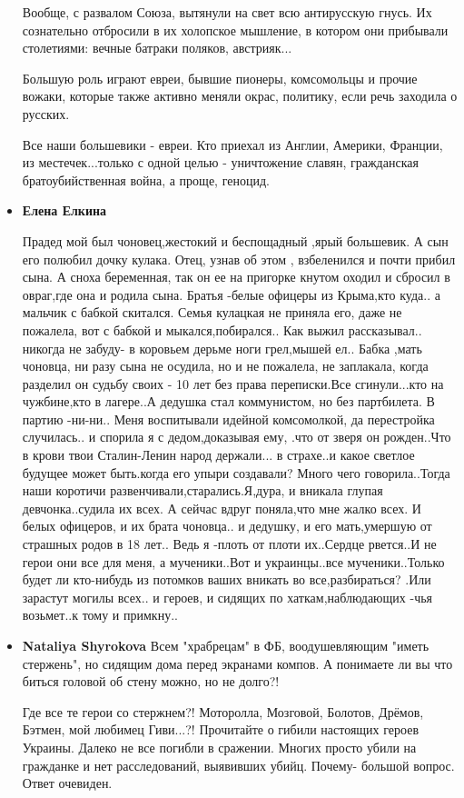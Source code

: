 \begin{itemize}
Вообще, с развалом Союза, вытянули на свет всю антирусскую гнусь. Их
сознательно отбросили в их холопское мышление, в котором они
прибывали столетиями: вечные батраки поляков, австрияк...

Большую роль играют евреи, бывшие пионеры, комсомольцы и прочие вожаки, которые
также активно меняли окрас, политику, если речь заходила о
русских.

Все наши большевики - евреи. Кто приехал из Англии, Америки, Франции, из
местечек...только с одной целью - уничтожение славян,
гражданская братоубийственная война, а проще, геноцид.

\item \textbf{Елена Елкина}

Прадед мой был чоновец,жестокий и беспощадный ,ярый большевик. А сын его
полюбил дочку кулака. Отец, узнав об этом , взбеленился и почти
прибил сына. А сноха беременная, так он ее на пригорке кнутом
оходил и сбросил в овраг,где она и родила сына. Братья -белые
офицеры из Крыма,кто куда.. а мальчик с бабкой скитался. Семья
кулацкая не приняла его, даже не пожалела, вот с бабкой и
мыкался,побирался.. Как выжил рассказывал.. никогда не забуду-
в коровьем дерьме ноги грел,мышей ел.. Бабка ,мать чоновца, ни
разу сына не осудила, но и не пожалела, не заплакала, когда
разделил он судьбу своих - 10 лет без права переписки.Все
сгинули...кто на чужбине,кто в лагере..А дедушка стал
коммунистом, но без партбилета. В партию -ни-ни.. Меня
воспитывали идейной комсомолкой, да перестройка случилась.. и
спорила я с дедом,доказывая ему, .что от зверя он рожден..Что в
крови твои Сталин-Ленин народ держали... в страхе..и какое
светлое будущее может быть.когда его упыри создавали? Много
чего говорила..Тогда наши коротичи
развенчивали,старались.Я,дура, и вникала глупая
девчонка..судила их всех. А сейчас вдруг поняла,что мне жалко
всех. И белых офицеров, и их брата чоновца.. и дедушку, и его
мать,умершую от страшных родов в 18 лет.. Ведь я -плоть от
плоти их..Сердце рвется..И не герои они все для меня, а
мученики..Вот и украинцы..все мученики..Только будет ли
кто-нибудь из потомков ваших вникать во все,разбираться? .Или
зарастут могилы всех.. и героев, и сидящих по
хаткам,наблюдающих -чья возьмет..к тому и примкну..

\item \textbf{Nataliya Shyrokova}
Всем "храбрецам" в ФБ, воодушевляющим "иметь стержень", но сидящим дома перед
экранами компов.  А понимаете ли вы что биться головой об стену можно, но не
долго?!

Где все те герои со стержнем?! Моторолла, Мозговой, Болотов, Дрёмов, Бэтмен, мой любимец Гиви...?! Прочитайте о гибили настоящих героев Украины. Далеко не все погибли в сражении. Многих просто убили на гражданке и нет расследований, выявивших убийц. Почему- большой вопрос. Ответ очевиден.


\end{itemize}
